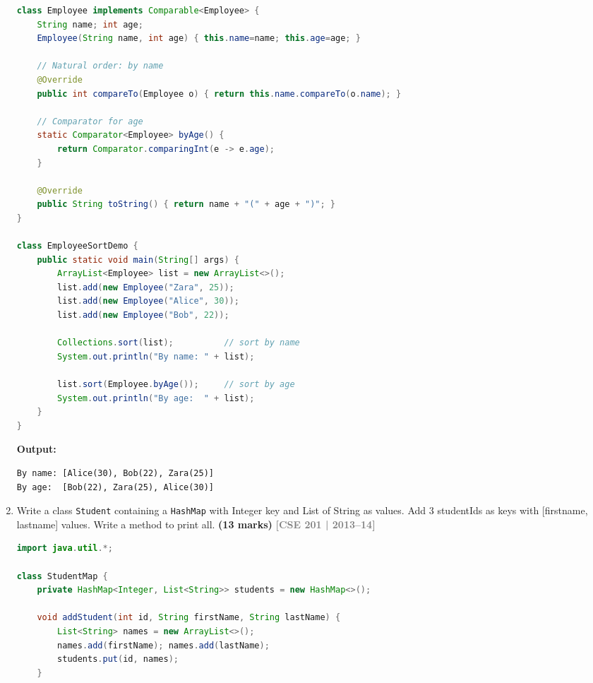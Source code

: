 \documentclass[12pt,a3paper]{article}
\newcommand{\yr}[1]{\hfill\textcolor{gray}{\small\textbf{[#1]}}}
\newcommand{\mk}[1]{\textcolor{orange!70!black}{\small\textbf{(#1 marks)}}}
\begin{document}
\begin{enumerate}
\begin{tcolorbox}[enhanced,breakable,ansbox,
  colback=cG!4,colframe=cG,boxrule=0.8pt,arc=5pt,
  title={\textbf{Answer --- Employee Sorted by Name or Age}},
  fonttitle=\bfseries\color{white},colbacktitle=cG]
\begin{lstlisting}[language=Java]
class Employee implements Comparable<Employee> {
    String name; int age;
    Employee(String name, int age) { this.name=name; this.age=age; }

    // Natural order: by name
    @Override
    public int compareTo(Employee o) { return this.name.compareTo(o.name); }

    // Comparator for age
    static Comparator<Employee> byAge() {
        return Comparator.comparingInt(e -> e.age);
    }

    @Override
    public String toString() { return name + "(" + age + ")"; }
}

class EmployeeSortDemo {
    public static void main(String[] args) {
        ArrayList<Employee> list = new ArrayList<>();
        list.add(new Employee("Zara", 25));
        list.add(new Employee("Alice", 30));
        list.add(new Employee("Bob", 22));

        Collections.sort(list);          // sort by name
        System.out.println("By name: " + list);

        list.sort(Employee.byAge());     // sort by age
        System.out.println("By age:  " + list);
    }
}
\end{lstlisting}
\textbf{Output:}
\begin{verbatim}
By name: [Alice(30), Bob(22), Zara(25)]
By age:  [Bob(22), Zara(25), Alice(30)]
\end{verbatim}
\end{tcolorbox}

\item Write a class \texttt{Student} containing a \texttt{HashMap} with Integer key and List of String as values. Add 3 studentIds as keys with [firstname, lastname] values. Write a method to print all. \mk{13}
\yr{CSE 201 | 2013--14}

\begin{tcolorbox}[enhanced,breakable,ansbox,
  colback=cG!4,colframe=cG,boxrule=0.8pt,arc=5pt,
  title={\textbf{Answer --- Student HashMap with List Values}},
  fonttitle=\bfseries\color{white},colbacktitle=cG]
\begin{lstlisting}[language=Java]
import java.util.*;

class StudentMap {
    private HashMap<Integer, List<String>> students = new HashMap<>();

    void addStudent(int id, String firstName, String lastName) {
        List<String> names = new ArrayList<>();
        names.add(firstName); names.add(lastName);
        students.put(id, names);
    }


\end{lstlisting}
\end{tcolorbox}
\end{enumerate}
\end{document}
